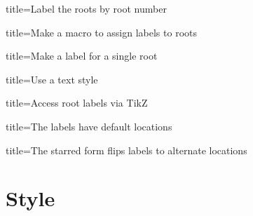 \documentclass{amsart}
\begin{document}
\begin{tcblisting}{title={Label the roots by root number}}
\end{tcblisting}
\begin{tcblisting}{title={Make a macro to assign labels to roots}}
\end{tcblisting}
\begin{tcblisting}{title={Make a label for a single root}}
\end{tcblisting}
\begin{tcblisting}{title={Use a text style}}
\end{tcblisting}
\begin{tcblisting}{title={Access root labels via TikZ}}
\end{tcblisting}
\begin{tcblisting}{title={The labels have default locations}}
\end{tcblisting}
\begin{tcblisting}{title={The starred form flips labels to alternate locations}}
\end{tcblisting}

\section{Style}
\end{document}
